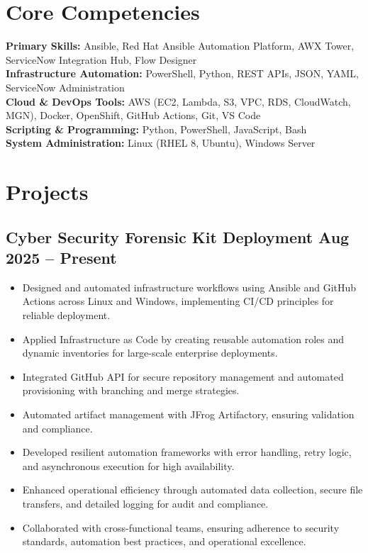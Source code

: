 \documentclass[a4paper,10pt]{article}
\begin{document}
\section*{Core Competencies}

\textbf{Primary Skills:} Ansible, Red Hat Ansible Automation Platform, AWX Tower, ServiceNow Integration Hub, Flow Designer\\[2pt]
\textbf{Infrastructure Automation:} PowerShell, Python, REST APIs, JSON, YAML, ServiceNow Administration\\[2pt]
\textbf{Cloud \& DevOps Tools:} AWS (EC2, Lambda, S3, VPC, RDS, CloudWatch, MGN), Docker, OpenShift, GitHub Actions, Git, VS Code\\[2pt]
\textbf{Scripting \& Programming:} Python, PowerShell, JavaScript, Bash\\[2pt]
\textbf{System Administration:} Linux (RHEL 8, Ubuntu), Windows Server

\section*{Projects}

\subsection*{Cyber Security Forensic Kit Deployment \hfill Aug 2025 -- Present}
\begin{itemize}
    \item Designed and automated infrastructure workflows using Ansible and GitHub Actions across Linux and Windows, implementing CI/CD principles for reliable deployment.
    \item Applied Infrastructure as Code by creating reusable automation roles and dynamic inventories for large-scale enterprise deployments.
    \item Integrated GitHub API for secure repository management and automated provisioning with branching and merge strategies.
    \item Automated artifact management with JFrog Artifactory, ensuring validation and compliance.
    \item Developed resilient automation frameworks with error handling, retry logic, and asynchronous execution for high availability.
    \item Enhanced operational efficiency through automated data collection, secure file transfers, and detailed logging for audit and compliance.
    \item Collaborated with cross-functional teams, ensuring adherence to security standards, automation best practices, and operational excellence.
\end{itemize}
\end{document}

